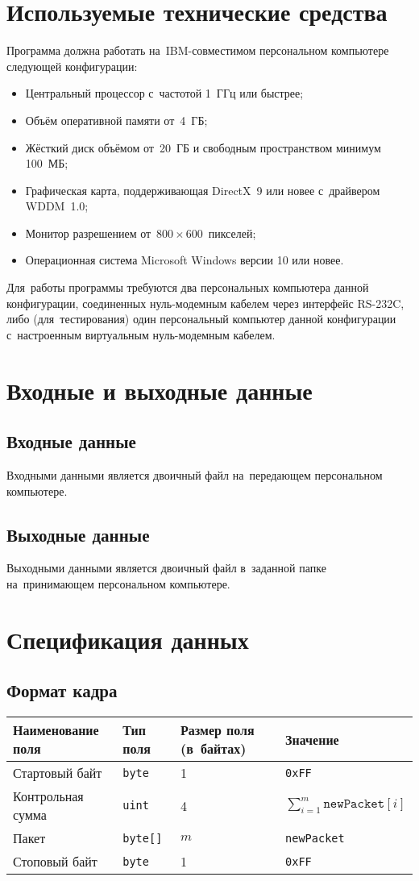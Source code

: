 \documentclass[a4paper,12pt]{article}
\begin{document}
\section{Используемые технические средства}
Программа должна работать на~IBM-совместимом персональном компьютере следующей конфигурации:
\begin{itemize}
\item Центральный процессор с~частотой 1~ГГц или быстрее;
\item Объём оперативной памяти от~4~ГБ;
\item Жёсткий диск объёмом от~20~ГБ и свободным пространством минимум 100~МБ;
\item Графическая карта, поддерживающая DirectX~9 или новее с~драйвером WDDM~1.0;
\item Монитор разрешением от~$800\times600$~пикселей;
\item Операционная система Microsoft Windows версии 10 или новее.
\end{itemize}
Для~работы программы требуются два персональных компьютера данной конфигурации, соединенных нуль-модемным кабелем через интерфейс RS-232C, либо (для~тестирования) один персональный компьютер данной конфигурации с~настроенным виртуальным нуль-модемным кабелем.

\section{Входные и выходные данные}
\subsection{Входные данные}
Входными данными является двоичный файл на~передающем персональном компьютере.

\subsection{Выходные данные}
Выходными данными является двоичный файл в~заданной папке на~принимающем персональном компьютере.

\section{Спецификация данных}
\subsection{Формат кадра}
\begin{center}
\begin{tabular}{|l|l|l|l|}
\hline
Наименование поля	&	Тип поля	&	Размер поля (в~байтах)	&	Значение\\\hline
Стартовый байт	&	\texttt{byte}	&	1	&	\texttt{0xFF}\\\hline
Контрольная сумма	&	\texttt{uint}	&	4	&	$\sum_{i=1}^{m}\mathtt{newPacket}[i]$\\\hline
Пакет	&	\texttt{byte[]}	&	$m$	&	\texttt{newPacket}\\\hline
Стоповый байт	&	\texttt{byte}	&	1	&	\texttt{0xFF}\\\hline
\end{tabular}
\end{center}
\end{document}
